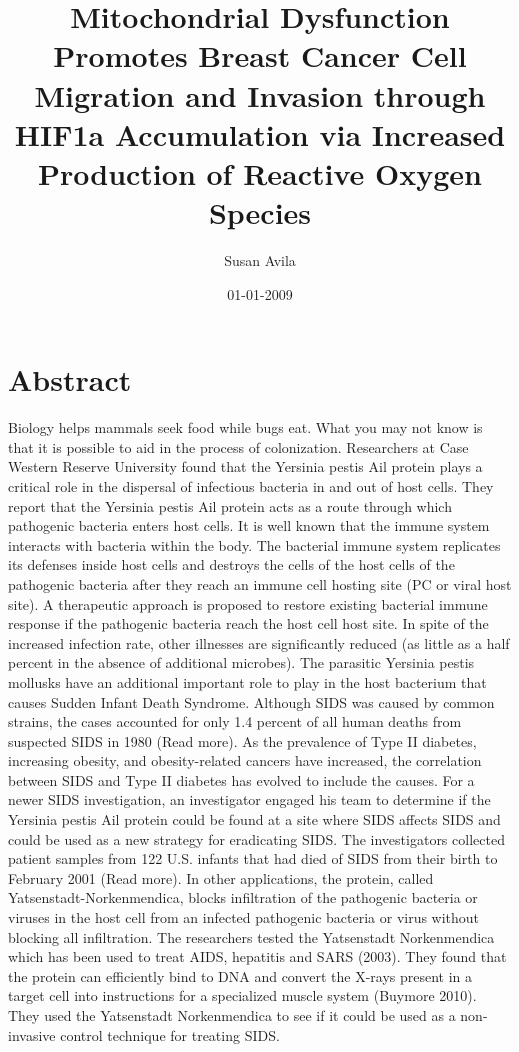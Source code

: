 \documentclass{article}%
\title{Mitochondrial Dysfunction Promotes Breast Cancer Cell Migration and Invasion through HIF1a Accumulation via Increased Production of Reactive Oxygen Species}%
\author{Susan Avila}%
\affil{School of Medicine, Chung Shan Medical University, 110 Chien{-}Kuo N. Road, Section 1, Taichung 402, Taiwan}%
\date{01{-}01{-}2009}%
\begin{document}
%
\normalsize%
\maketitle%
\section{Abstract}%
\label{sec:Abstract}%
Biology helps mammals seek food while bugs eat. What you may not know is that it is possible to aid in the process of colonization.\newline%
Researchers at Case Western Reserve University found that the Yersinia pestis Ail protein plays a critical role in the dispersal of infectious bacteria in and out of host cells. They report that the Yersinia pestis Ail protein acts as a route through which pathogenic bacteria enters host cells.\newline%
It is well known that the immune system interacts with bacteria within the body. The bacterial immune system replicates its defenses inside host cells and destroys the cells of the host cells of the pathogenic bacteria after they reach an immune cell hosting site (PC or viral host site).\newline%
A therapeutic approach is proposed to restore existing bacterial immune response if the pathogenic bacteria reach the host cell host site. In spite of the increased infection rate, other illnesses are significantly reduced (as little as a half percent in the absence of additional microbes).\newline%
The parasitic Yersinia pestis mollusks have an additional important role to play in the host bacterium that causes Sudden Infant Death Syndrome. Although SIDS was caused by common strains, the cases accounted for only 1.4 percent of all human deaths from suspected SIDS in 1980 (Read more). As the prevalence of Type II diabetes, increasing obesity, and obesity{-}related cancers have increased, the correlation between SIDS and Type II diabetes has evolved to include the causes.\newline%
For a newer SIDS investigation, an investigator engaged his team to determine if the Yersinia pestis Ail protein could be found at a site where SIDS affects SIDS and could be used as a new strategy for eradicating SIDS. The investigators collected patient samples from 122 U.S. infants that had died of SIDS from their birth to February 2001 (Read more).\newline%
In other applications, the protein, called Yatsenstadt{-}Norkenmendica, blocks infiltration of the pathogenic bacteria or viruses in the host cell from an infected pathogenic bacteria or virus without blocking all infiltration. The researchers tested the Yatsenstadt Norkenmendica which has been used to treat AIDS, hepatitis and SARS (2003). They found that the protein can efficiently bind to DNA and convert the X{-}rays present in a target cell into instructions for a specialized muscle system (Buymore 2010). They used the Yatsenstadt Norkenmendica to see if it could be used as a non{-}invasive control technique for treating SIDS.\newline%
\end{document}
